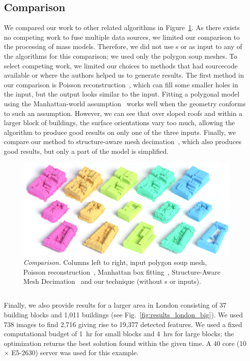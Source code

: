 \subsection{Comparison}
We compared our work to other related algorithms in Figure~\ref{fig:comparis2}. As there exists no competing work to fuse multiple data sources, we limited our comparison to the processing of mass models. Therefore, we did not use {\GISd}s or \buildingfacades as input to any of the algorithms for this comparison; we used only the polygon soup meshes. To select competing work, we limited our choices to methods that had sourcecode available or where the authors helped us to generate results. The first method in our comparison is Poisson reconstruction~\cite{Kazhdan2006}, which can fill some smaller holes in the input, but the output looks similar to the input. Fitting a polygonal model using the Manhattan-world assumption~\cite{li2016manhattan} works well when the geometry conforms to such an assumption. However, we can see that over sloped roofs and within a larger block of buildings, the surface orientations vary too much, allowing the algorithm to produce good results on only one of the three inputs. Finally, we compare our method to structure-aware mesh decimation~\cite{salinas2015structure}, which also produces good results, but only a part of the model is simplified.


\begin{figure}[t!]
    \centering
        \includegraphics[width=\linewidth]{../images/results/comparis2.png}
  \caption{{\it Comparison.} Columns left to right, input polygon soup mesh, Poisson reconstruction~\cite{Kazhdan2006}, Manhattan box fitting~\cite{li2016manhattan}, Structure-Aware Mesh Decimation~\cite{salinas2015structure} and our technique (without {\GISd}s or \buildingfacade inputs).}
  \label{fig:comparis2}
  \vnudge
\end{figure}


\subsection{\LondonRS} 
Finally, we also provide results for a larger area in London consisting of 37 building blocks and 1,011 buildings (see Fig.~\ref{fig:results_london_big}). We used 738 images to find 2,716 \buildingfacades giving rise to 19,377 detected features.
We used a fixed computational budget of 1~hr for small blocks and 4~hrs for large blocks; the optimization returns the best solution found within the given time. A 40 core (10 $\times$ E5-2630) server was used for this example. 





